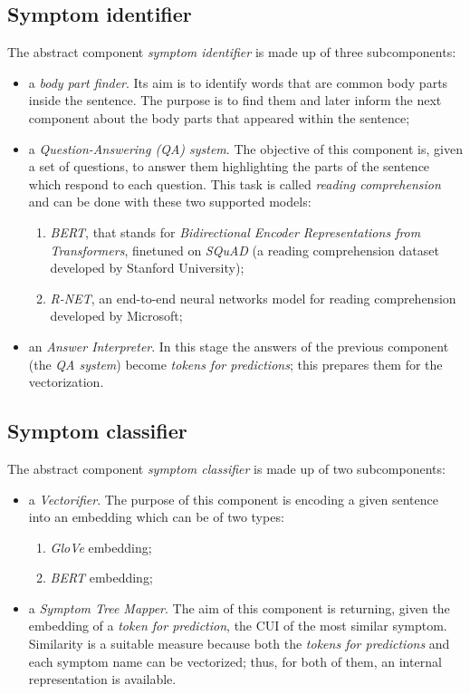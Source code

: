 \subsection{Symptom identifier}
The abstract component \textit{symptom identifier} is made up of three subcomponents:
\begin{itemize}
  \item a \textit{body part finder}. Its aim is to identify words that are common body parts inside the sentence. The purpose is to find them and later inform the next component about the body parts that appeared within the sentence;
  \item a \textit{Question-Answering (QA) system}. The objective of this component is, given a set of questions, to answer them highlighting the parts of the sentence which respond to each question. This task is called \textit{reading comprehension} and can be done with these two supported models:
    \begin{enumerate}
      \item \textit{BERT}, that stands for \textit{Bidirectional Encoder Representations from Transformers}, finetuned on \textit{SQuAD} (a reading comprehension dataset developed by Stanford University);
      \item \textit{R-NET}, an end-to-end neural networks model for reading comprehension developed by Microsoft;
    \end{enumerate}
  \item an \textit{Answer Interpreter}. In this stage the answers of the previous component (the \textit{QA system}) become \textit{tokens for predictions}; this prepares them for the vectorization.
\end{itemize}

\subsection{Symptom classifier}
The abstract component \textit{symptom classifier} is made up of two subcomponents:
\begin{itemize}
  \item a \textit{Vectorifier}. The purpose of this component is encoding a given sentence into an embedding which can be of two types:
  \begin{enumerate}
    \item \textit{GloVe} embedding;
    \item \textit{BERT} embedding;
  \end{enumerate}
  \item a \textit{Symptom Tree Mapper}. The aim of this component is returning, given the embedding of a \textit{token for prediction}, the CUI of the most similar symptom. Similarity is a suitable measure because both the \textit{tokens for predictions} and each symptom name can be vectorized; thus, for both of them, an internal representation is available.
\end{itemize}

